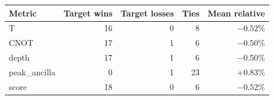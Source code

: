 \begin{tabular}{lrrrr}
\toprule
Metric & Target wins & Target losses & Ties & Mean relative \\
\midrule
T & 16 & 0 & 8 & $-0.52\%$ \\
CNOT & 17 & 1 & 6 & $-0.50\%$ \\
depth & 17 & 1 & 6 & $-0.50\%$ \\
peak_ancilla & 0 & 1 & 23 & $+0.83\%$ \\
score & 18 & 0 & 6 & $-0.52\%$ \\
\bottomrule
\end{tabular}
